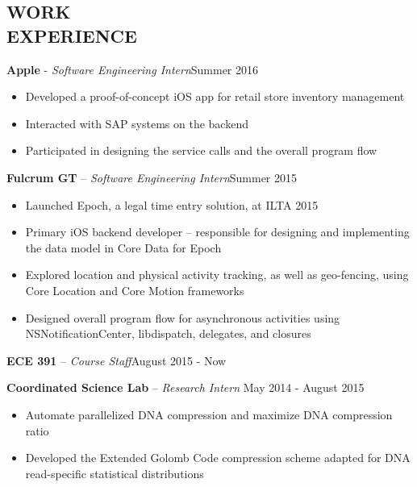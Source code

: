\documentclass[resmargin]{res}
\begin{document}
\begin{resume}
\vspace{-4mm}
\section{WORK \\ EXPERIENCE} 
{\bf Apple} - {\sl Software Engineering Intern}\hfill Summer 2016
	\begin{itemize} \itemsep -2pt
	\item Developed a proof-of-concept iOS app for retail store inventory management
	\item Interacted with SAP systems on the backend
	\item Participated in designing the service calls and the overall program flow 
	\end{itemize}

\vspace{-3mm}
{\bf Fulcrum GT} -- {\sl Software Engineering Intern}\hfill Summer 2015
	\begin{itemize} \itemsep -2pt
	\item Launched Epoch, a legal time entry solution, at ILTA 2015
	\item Primary iOS backend developer -- responsible for designing and implementing the data model in Core Data for Epoch
	\item Explored location and physical activity tracking, as well as geo-fencing, using Core Location and Core Motion frameworks
	\item Designed overall program flow for asynchronous activities using NSNotificationCenter, libdispatch, delegates, and closures
	\end{itemize}
	
\vspace{-3mm}
{\bf ECE 391} -- {\sl Course Staff}\hfill August 2015 - Now

\vspace{-3mm}
{\bf Coordinated Science Lab} -- {\sl Research Intern }\hfill May 2014 - August 2015
	\begin{itemize}  \itemsep -2pt %
	\item Automate parallelized DNA compression and maximize DNA compression ratio
	\item Developed the Extended Golomb Code compression scheme adapted for DNA read-specific statistical distributions
	\end{itemize}
 
\vspace{-4mm}

\end{resume}
\end{document}
